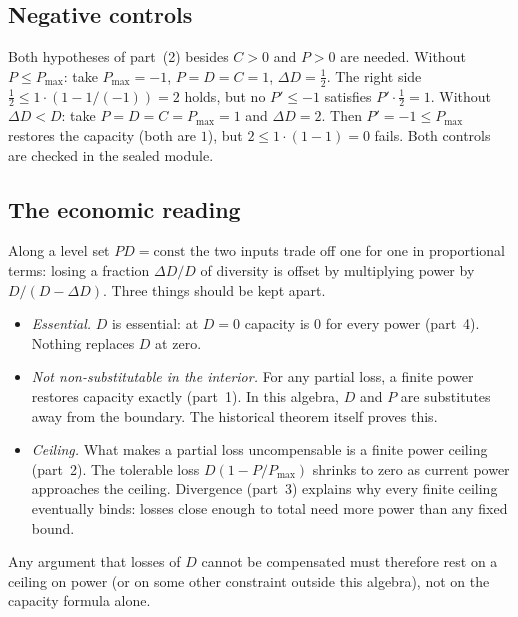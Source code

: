 \documentclass[11pt]{article}
\theoremstyle{remark}
\begin{document}
\subsection{Negative controls}
Both hypotheses of part~(2) besides $C>0$ and $P>0$ are needed. Without $P\le P_{\max}$: take
$P_{\max}=-1$, $P=D=C=1$, $\Delta D=\tfrac12$. The right side
$\tfrac12\le1\cdot(1-1/(-1))=2$ holds, but no $P'\le-1$ satisfies $P'\cdot\tfrac12=1$. Without
$\Delta D<D$: take $P=D=C=P_{\max}=1$ and $\Delta D=2$. Then $P'=-1\le P_{\max}$ restores the
capacity (both are $1$), but $2\le1\cdot(1-1)=0$ fails. Both controls are checked in the sealed
module.

\subsection{The economic reading}
Along a level set $PD=\text{const}$ the two inputs trade off one for one in proportional terms:
losing a fraction $\Delta D/D$ of diversity is offset by multiplying power by $D/(D-\Delta D)$.
Three things should be kept apart.
\begin{itemize}
\item \emph{Essential.} $D$ is essential: at $D=0$ capacity is $0$ for every power
  (part~4). Nothing replaces $D$ at zero.
\item \emph{Not non-substitutable in the interior.} For any partial loss, a finite power restores
  capacity exactly (part~1). In this algebra, $D$ and $P$ are substitutes away from the boundary.
  The historical theorem itself proves this.
\item \emph{Ceiling.} What makes a partial loss uncompensable is a finite power ceiling
  (part~2). The tolerable loss $D(1-P/P_{\max})$ shrinks to zero as current power approaches the
  ceiling. Divergence (part~3) explains why every finite ceiling eventually binds: losses close
  enough to total need more power than any fixed bound.
\end{itemize}
Any argument that losses of $D$ cannot be compensated must therefore rest on a ceiling on power
(or on some other constraint outside this algebra), not on the capacity formula alone.
\end{document}
